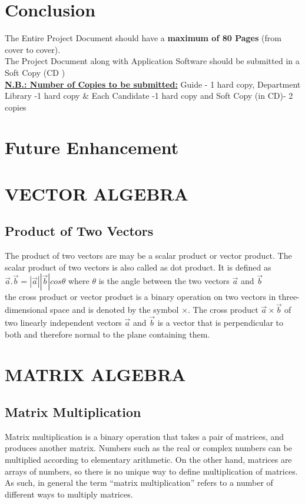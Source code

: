 \documentclass[BTech]{srmuthesis}
\begin{document}
\chapter{Conclusion}
The Entire Project Document should have a \textbf{maximum of 80 Pages} (from cover to cover).\\
The Project Document along with Application Software should be submitted in a Soft Copy (CD )\\
\underline{\textbf{N.B.: Number of Copies to be submitted:}}
Guide - 1 hard copy, Department Library -1 hard copy \&
 Each Candidate -1 hard copy and Soft Copy (in CD)- 2 copies
\chapter{Future Enhancement}


\appendix
\chapter{VECTOR ALGEBRA}
\section{Product of Two Vectors}
\label{app:vp}
The product of two vectors are may be a scalar product or vector product. The scalar product of two vectors is also called as dot product. It is defined as $\vec{a} . \vec{b}=|\vec{a}||\vec{b}|cos\theta$ where $\theta$ is the angle between the two vectors $\vec{a}$ and $\vec{b}$\\

the cross product or vector product is a binary operation on two vectors in three-dimensional space and is denoted by the symbol $\times$. The cross product $\vec{a}\times\vec{b}$ of two linearly independent vectors $\vec{a}$ and $\vec{b}$ is a vector that is perpendicular to both and therefore normal to the plane containing them. 
\chapter{MATRIX ALGEBRA}
\section{Matrix Multiplication}
Matrix multiplication is a binary operation that takes a pair of matrices, and produces another matrix. Numbers such as the real or complex numbers can be multiplied according to elementary arithmetic. On the other hand, matrices are arrays of numbers, so there is no unique way to define multiplication of matrices. As such, in general the term ``matrix multiplication'' refers to a number of different ways to multiply matrices. 

\begin{singlespace}
\end{singlespace}
  
\end{document}
